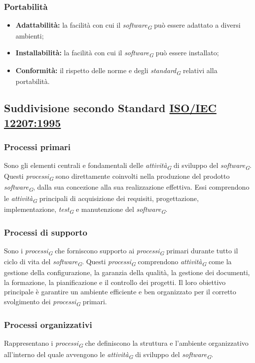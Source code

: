 \subsubsection{Portabilità}
\begin{itemize}
    \item \textbf{Adattabilità:} la facilità con cui il \textit{software}\textsubscript{\textit{G}} può essere adattato a diversi ambienti;
    \item \textbf{Installabilità:} la facilità con cui il \textit{software}\textsubscript{\textit{G}} può essere installato;
    \item \textbf{Conformità:} il rispetto delle norme e degli \textit{standard}\textsubscript{\textit{G}} relativi alla portabilità.
\end{itemize}

\subsection{Suddivisione secondo Standard \href{https://www.math.unipd.it/~tullio/IS-1/2009/Approfondimenti/ISO_12207-1995.pdf}{ISO/IEC 12207:1995}}

\subsubsection{Processi primari}
Sono gli elementi centrali e fondamentali delle \textit{attività}\textsubscript{\textit{G}} di sviluppo del \textit{software}\textsubscript{\textit{G}}. Questi \textit{processi}\textsubscript{\textit{G}} sono direttamente coinvolti nella produzione del prodotto \textit{software}\textsubscript{\textit{G}}, dalla sua concezione alla sua realizzazione effettiva. Essi comprendono le \textit{attività}\textsubscript{\textit{G}} principali di acquisizione dei requisiti, progettazione, implementazione, \textit{test}\textsubscript{\textit{G}} e manutenzione del \textit{software}\textsubscript{\textit{G}}.

\subsubsection{Processi di supporto}
Sono i \textit{processi}\textsubscript{\textit{G}} che forniscono supporto ai \textit{processi}\textsubscript{\textit{G}} primari durante tutto il ciclo di vita del \textit{software}\textsubscript{\textit{G}}. Questi \textit{processi}\textsubscript{\textit{G}} comprendono \textit{attività}\textsubscript{\textit{G}} come la gestione della configurazione, la garanzia della qualità, la gestione dei documenti, la formazione, la pianificazione e il controllo dei progetti. Il loro obiettivo principale è garantire un ambiente efficiente e ben organizzato per il corretto svolgimento dei \textit{processi}\textsubscript{\textit{G}} primari.

\subsubsection{Processi organizzativi}
Rappresentano i \textit{processi}\textsubscript{\textit{G}} che definiscono la struttura e l'ambiente organizzativo all'interno del quale avvengono le \textit{attività}\textsubscript{\textit{G}} di sviluppo del \textit{software}\textsubscript{\textit{G}}. 
